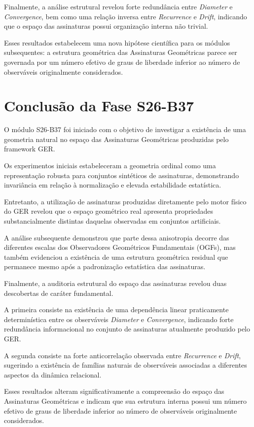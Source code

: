 \documentclass[11pt,a4paper]{article}
\begin{document}
Finalmente, a análise estrutural revelou forte redundância entre
\emph{Diameter} e \emph{Convergence}, bem como uma relação inversa entre
\emph{Recurrence} e \emph{Drift}, indicando que o espaço das assinaturas
possui organização interna não trivial.

Esses resultados estabelecem uma nova hipótese científica para os módulos
subsequentes: a estrutura geométrica das Assinaturas Geométricas parece ser
governada por um número efetivo de graus de liberdade inferior ao número de
observáveis originalmente considerados.

\section{Conclusão da Fase S26-B37}

O módulo S26-B37 foi iniciado com o objetivo de investigar a existência de
uma geometria natural no espaço das Assinaturas Geométricas produzidas pelo
framework GER.

Os experimentos iniciais estabeleceram a geometria ordinal como uma
representação robusta para conjuntos sintéticos de assinaturas,
demonstrando invariância em relação à normalização e elevada estabilidade
estatística.

Entretanto, a utilização de assinaturas produzidas diretamente pelo motor
físico do GER revelou que o espaço geométrico real apresenta propriedades
substancialmente distintas daquelas observadas em conjuntos artificiais.

A análise subsequente demonstrou que parte dessa anisotropia decorre das
diferentes escalas dos Observadores Geométricos Fundamentais (OGFs), mas
também evidenciou a existência de uma estrutura geométrica residual que
permanece mesmo após a padronização estatística das assinaturas.

Finalmente, a auditoria estrutural do espaço das assinaturas revelou duas
descobertas de caráter fundamental.

A primeira consiste na existência de uma dependência linear praticamente
determinística entre os observáveis \emph{Diameter} e
\emph{Convergence}, indicando forte redundância informacional no conjunto
de assinaturas atualmente produzido pelo GER.

A segunda consiste na forte anticorrelação observada entre
\emph{Recurrence} e \emph{Drift}, sugerindo a existência de famílias
naturais de observáveis associadas a diferentes aspectos da dinâmica
relacional.

Esses resultados alteram significativamente a compreensão do espaço das
Assinaturas Geométricas e indicam que sua estrutura interna possui um
número efetivo de graus de liberdade inferior ao número de observáveis
originalmente considerados.
\end{document}
